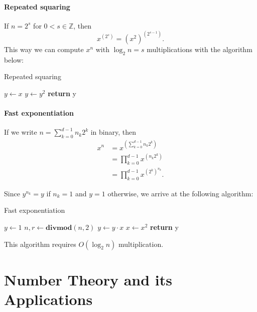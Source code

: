 \documentclass{article}
\newcommand{\Z}{\mathbb{Z}}
\newcommand*{\divmod}[2]{\mathbf{divmod}\left( #1, #2 \right)}
\begin{document}
\paragraph{Repeated squaring}
If $n=2^s$ for $0 < s \in \Z$, then
\[
    x^{\left(2^s\right)} = \left(x^2\right)^{\left(2^{s-1}\right)}.
\]
This way we can compute $x^n$ with $\log_2 n = s$ multiplications with the algorithm below:
\begin{algorithm}
    \caption{Repeated squaring}
    \label{alg:repeated-squaring}
    \begin{algorithmic}[1]
            \State $y \gets x$
                \State $y \gets y^2$
            \EndFor
            \State \textbf{return} y
        \EndProcedure
    \end{algorithmic}
\end{algorithm}

\paragraph{Fast exponentiation}

If we write $n = \sum_{k=0}^{d-1}n_k 2^k$ in binary, then
\begin{align*}
    x^n & = x^{\left( \sum_{k=0}^{d-1}n_k 2^k \right)} \\
        & = \prod_{k=0}^{d-1} x^{\left( n_k 2^k \right)} \\
        & = \prod_{k=0}^{d-1} x^{\left( 2^k \right)^{n_k}}.
\end{align*}

Since $y^{n_k} = y$ if $n_k=1$ and $y=1$ otherwise, we arrive at the following algorithm:
\begin{algorithm}
    \caption{Fast exponentiation}
    \label{alg:fast-exp}
    \begin{algorithmic}[1]
            \State $y \gets 1$
                \State $n, r \gets \divmod{n}{2}$
                    \State $y \gets y \cdot x$
                \EndIf
                \State $x \gets x^2$
            \EndWhile
            \State \textbf{return} y
        \EndProcedure
    \end{algorithmic}
\end{algorithm}

This algorithm requires $O(\log_2 n)$ multiplication.

\section{Number Theory and its Applications}
\end{document}
